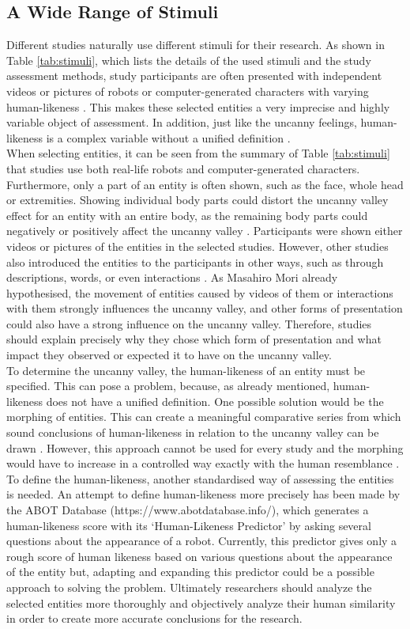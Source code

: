 \subsection{A Wide Range of Stimuli}
Different studies naturally use different stimuli for their research. As shown in Table \ref{tab:stimuli}, which lists the details of the used stimuli and the study assessment methods, study participants are often presented with independent videos or pictures of robots or computer-generated characters with varying human-likeness \cite{quant_review}. This makes these selected entities a very imprecise and highly variable object of assessment. In addition, just like the uncanny feelings, human-likeness is a complex variable without a unified definition \cite{quant_review}.\\
When selecting entities, it can be seen from the summary of Table \ref{tab:stimuli} that studies use both real-life robots and computer-generated characters. Furthermore, only a part of an entity is often shown, such as the face, whole head or extremities. Showing individual body parts could distort the uncanny valley effect for an entity with an entire body, as the remaining body parts could negatively or positively affect the uncanny valley \cite{quant_review}. Participants were shown either videos or pictures of the entities in the selected studies. However, other studies also introduced the entities to the participants in other ways, such as through descriptions, words, or even interactions \cite{quant_review}. As Masahiro Mori \cite{original_masahiro} already hypothesised, the movement of entities caused by videos of them or interactions with them strongly influences the uncanny valley, and other forms of presentation could also have a strong influence on the uncanny valley. Therefore, studies should explain precisely why they chose which form of presentation and what impact they observed or expected it to have on the uncanny valley.\\
To determine the uncanny valley, the human-likeness of an entity must be specified. This can pose a problem, because, as already mentioned, human-likeness does not have a unified definition.
One possible solution would be the morphing of entities. This can create a meaningful comparative series from which sound conclusions of human-likeness in relation to the uncanny valley can be drawn \cite{quant_review}. However, this approach cannot be used for every study and the morphing would have to increase in a controlled way exactly with the human resemblance \cite{quant_review}.
To define the human-likeness, another standardised way of assessing the entities is needed.
An attempt to define human-likeness more precisely has been made by the ABOT Database (https://www.abotdatabase.info/), which generates a human-likeness score with its `Human-Likeness Predictor' by asking several questions about the appearance of a robot.
Currently, this predictor gives only a rough score of human likeness based on various questions about the appearance of the entity but, adapting and expanding this predictor could be a possible approach to solving the problem. Ultimately researchers should analyze the selected entities more thoroughly and objectively analyze their human similarity in order to create more accurate conclusions for the research.

